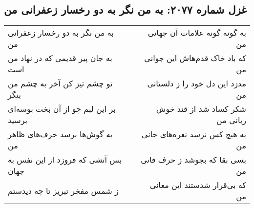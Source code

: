 \begin{center}
\section*{غزل شماره ۲۰۷۷: به من نگر به دو رخسار زعفرانی من}
\label{sec:2077}
\begin{longtable}{l p{0.5cm} r}
به من نگر به دو رخسار زعفرانی من
&&
به گونه گونه علامات آن جهانی من
\\
به جان پیر قدیمی که در نهاد من است
&&
که باد خاک قدم‌هاش این جوانی من
\\
تو چشم تیز کن آخر به چشم من بنگر
&&
مدزد این دل خود را ز دلستانی من
\\
بر این لبم چو از آن بخت بوسه‌ای برسید
&&
شکر کساد شد از قند خوش زبانی من
\\
به گوش‌ها برسد حرف‌های ظاهر من
&&
به هیچ کس نرسد نعره‌های جانی من
\\
بس آتشی که فروزد از این نفس به جهان
&&
بسی بقا که بجوشد ز حرف فانی من
\\
ز شمس مفخر تبریز تا چه دیدستم
&&
که بی‌قرار شدستند این معانی من
\\
\end{longtable}
\end{center}
